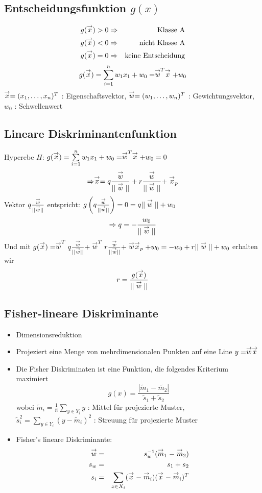 \subsection{Entscheidungsfunktion $g(x)$}

\begin{eqnarray*}
g(\stackrel{\to}{x}) > 0 &\Rightarrow& \textrm{Klasse A} \\ g(\stackrel{\to}{x}) < 0 &\Rightarrow& \textrm{nicht Klasse A} \\ g(\stackrel{\to}{x}) = 0 &\Rightarrow& \textrm{keine Entscheidung}
\end{eqnarray*}
$$g(\stackrel{\to}{x}) = \sum\limits_{i=1}^n w_1x_1 + w_0 = \stackrel{\to}{w}^T \stackrel{\to}{x} + w_0$$
$\stackrel{\to}{x} = (x_1,\dots,x_n)^T$ : Eigenschaftsvektor, $\stackrel{\to}{w} = (w_1,\dots,w_n)^T$ : Gewichtungsvektor, $w_0$ : Schwellenwert

\subsection{Lineare Diskriminantenfunktion}

Hyperebe $H$: $g(\stackrel{\to}{x}) = \sum\limits_{i=1}^n w_1x_1 + w_0 = \stackrel{\to}{w}^T \stackrel{\to}{x} + w_0 = 0$
$$\Rightarrow \stackrel{\to}{x} = q \frac{\stackrel{\to}{w}}{|| \stackrel{\to}{w} ||} + r \frac{\stackrel{\to}{w}}{|| \stackrel{\to}{w} ||} + \stackrel{\to}{x}_p$$
Vektor $q \frac{\stackrel{\to}{w}}{|| \stackrel{\to}{w} ||}$ entspricht: $g \left(q \frac{\stackrel{\to}{w}}{|| \stackrel{\to}{w} ||} \right) = 0 = q ||\stackrel{\to}{w}|| + w_0$ $$\Rightarrow q = - \frac{w_0}{|| \stackrel{\to}{w} ||}$$
Und mit $g(\stackrel{\to}{x}) = \stackrel{\to}{w}^T q \frac{\stackrel{\to}{w}}{|| \stackrel{\to}{w} ||} + \stackrel{\to}{w}^T r \frac{\stackrel{\to}{w}}{|| \stackrel{\to}{w} ||} + \stackrel{\to}{w} \stackrel{\to}{x}_p + w_0 = -w_0 + r ||\stackrel{\to}{w}|| + w_0$ erhalten wir $$r = \frac{g(\stackrel{\to}{x})}{|| \stackrel{\to}{w} ||}$$

\subsection{Fisher-lineare Diskriminante}

\begin{itemize}
\item Dimensionsreduktion
\item Projeziert eine Menge von mehrdimensionalen Punkten auf eine Line $y = \stackrel{\to}{w} \stackrel{\to}{x}$
\item Die Fisher Diskriminaten ist eine Funktion, die folgendes Kriterium maximiert $$g(x) = \frac{| \tilde{m}_1 - \tilde{m_2}|}{\tilde{s}_1 + \tilde{s}_2}$$
wobei $\tilde{m}_i = \frac{1}{n} \sum\limits_{y \in Y_i} y$ : Mittel für projezierte Muster, $\tilde{s}_i^2 = \sum\limits_{y \in Y_i} (y - \tilde{m}_i)^2$ : Streuung für projezierte Muster
\item Fisher's lineare Diskriminante:
\begin{eqnarray*}
\stackrel{\to}{w} &=& s_w^{-1} (\stackrel{\to}{m}_1 - \stackrel{\to}{m}_2) \\ s_w &=& s_1 + s_2 \\ s_i &=& \sum\limits_{x \in X_i} (\stackrel{\to}{x} - \stackrel{\to}{m}_i)(\stackrel{\to}{x} - \stackrel{\to}{m}_i)^T
\end{eqnarray*}
\end{itemize}

